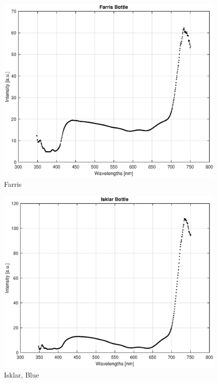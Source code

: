\begin{appendices}
\begin{figure}
    \centering
    \includegraphics[width = 12cm]{Images/appendix/farris.eps}
    \caption{Farris}
\end{figure}

\begin{figure}
    \centering
    \includegraphics[width = 12cm]{Images/appendix/isklar_blue.eps}
    \caption{Isklar, Blue}
    \label{fig:isklar}
\end{figure}


\end{appendices}
